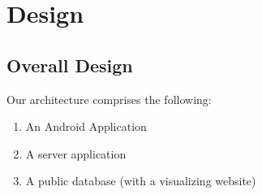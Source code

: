 \chapter{Design}\label{chapter:analysis}

\section{Overall Design}
Our architecture comprises the following:
\begin{enumerate}
	\item An Android Application
	\item A server application
	\item A public database (with a visualizing website)
\end{enumerate}

